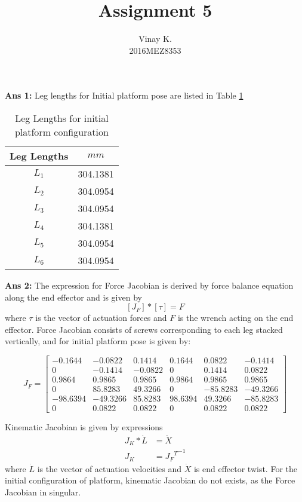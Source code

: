 \documentclass[10pt]{article}
\title{Assignment 5}
\author{Vinay K.\\
2016MEZ8353}
\begin{document}
\maketitle

\textbf{Ans 1:} Leg lengths for Initial platform pose are listed in Table \ref{InLegLn}
\begin{table}[h!]
	\caption{Leg Lengths for initial platform configuration}
	\label{InLegLn}
	\centering
	\begin{tabular}{cc}
		\hline
		Leg Lengths  &  $mm$\\
		\hline
		$L_1$ &   304.1381\\
		$L_2$ &   304.0954\\
		$L_3$ &   304.0954\\
		$L_4$ &   304.1381\\
		$L_5$ &   304.0954\\
		$L_6$ &   304.0954\\
		\hline
	\end{tabular}
\end{table}

\textbf{Ans 2:} The expression for Force Jacobian is derived by force balance equation along the end effector and is given by $$[J_F]*[\tau] = F$$ where $\tau$ is the vector of actuation forces and $F$ is the wrench acting on the end effector. Force Jacobian consists of screws corresponding to each leg stacked vertically, and for initial platform pose is given by:

\begin{equation*}
J_F = \begin{bmatrix}
-0.1644	&	-0.0822		& 0.1414  &  0.1644  &  0.0822  & -0.1414  \\
0		&	-0.1414		& -0.0822 &        0 &   0.1414 &   0.0822 \\
0.9864	&	0.9865		& 0.9865  &  0.9864  &  0.9865  &  0.9865  \\
0		&	85.8283     & 49.3266 &        0 & -85.8283 & -49.3266 \\
-98.6394&	-49.3266    & 85.8283 &  98.6394 &  49.3266 & -85.8283 \\
0		&	0.0822      & 0.0822  &       0  &  0.0822  &  0.0822
\end{bmatrix}
\end{equation*}

Kinematic Jacobian is given by expressions
\begin{align*}
J_K*\dot{L}&=\dot{X}\\
J_K & = {{J_F}^T}^{-1} 
\end{align*} 
where $\dot{L}$ is the vector of actuation velocities and $\dot{X}$ is end effector twist. For the initial configuration of platform, kinematic Jacobian do not exists, as the Force Jacobian in singular.
\end{document}

